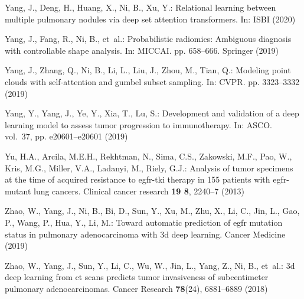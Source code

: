 \documentclass[runningheads]{llncs}
\begin{document}
\begin{thebibliography}{10}
Yang, J., Deng, H., Huang, X., Ni, B., Xu, Y.: Relational learning between
  multiple pulmonary nodules via deep set attention transformers. In: ISBI
  (2020)

Yang, J., Fang, R., Ni, B., et~al.: Probabilistic radiomics: Ambiguous
  diagnosis with controllable shape analysis. In: MICCAI. pp. 658--666.
  Springer (2019)

Yang, J., Zhang, Q., Ni, B., Li, L., Liu, J., Zhou, M., Tian, Q.: Modeling
  point clouds with self-attention and gumbel subset sampling. In: CVPR. pp.
  3323--3332 (2019)

Yang, Y., Yang, J., Ye, Y., Xia, T., Lu, S.: Development and validation of a
  deep learning model to assess tumor progression to immunotherapy. In: ASCO.
  vol.~37, pp. e20601--e20601 (2019)

Yu, H.A., Arcila, M.E.H., Rekhtman, N., Sima, C.S., Zakowski, M.F., Pao, W.,
  Kris, M.G., Miller, V.A., Ladanyi, M., Riely, G.J.: Analysis of tumor
  specimens at the time of acquired resistance to egfr-tki therapy in 155
  patients with egfr-mutant lung cancers. Clinical cancer research  \textbf{19
  8},  2240--7 (2013)

Zhao, W., Yang, J., Ni, B., Bi, D., Sun, Y., Xu, M., Zhu, X., Li, C., Jin, L.,
  Gao, P., Wang, P., Hua, Y., Li, M.: Toward automatic prediction of egfr
  mutation status in pulmonary adenocarcinoma with 3d deep learning. Cancer
  Medicine  (2019)

Zhao, W., Yang, J., Sun, Y., Li, C., Wu, W., Jin, L., Yang, Z., Ni, B., et~al.:
  3d deep learning from ct scans predicts tumor invasiveness of subcentimeter
  pulmonary adenocarcinomas. Cancer Research  \textbf{78}(24),  6881--6889
  (2018)

\end{thebibliography}
 
\end{document}
